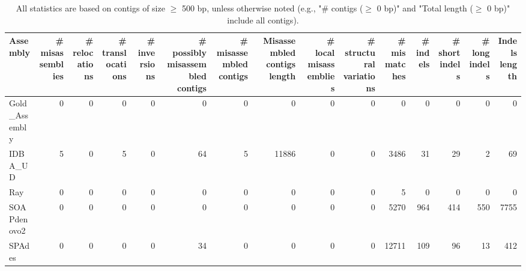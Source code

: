 \documentclass[12pt,a4paper]{article}
\begin{document}
\begin{table}[ht]
\begin{center}
\caption{All statistics are based on contigs of size $\geq$ 500 bp, unless otherwise noted (e.g., "\# contigs ($\geq$ 0 bp)" and "Total length ($\geq$ 0 bp)" include all contigs).}
\begin{tabular}{|l*{14}{|r}|}
\hline
Assembly & \# misassemblies &     \# relocations &     \# translocations &     \# inversions & \# possibly misassembled contigs & \# misassembled contigs & Misassembled contigs length & \# local misassemblies & \# structural variations & \# mismatches & \# indels &     \# short indels &     \# long indels & Indels length \\ \hline
Gold\_Assembly & 0 & 0 & 0 & 0 & 0 & 0 & 0 & 0 & 0 & 0 & 0 & 0 & 0 & 0 \\ \hline
IDBA\_UD & 5 & 0 & 5 & 0 & 64 & 5 & 11886 & 0 & 0 & 3486 & 31 & 29 & 2 & 69 \\ \hline
Ray & 0 & 0 & 0 & 0 & 0 & 0 & 0 & 0 & 0 & 5 & 0 & 0 & 0 & 0 \\ \hline
SOAPdenovo2 & 0 & 0 & 0 & 0 & 0 & 0 & 0 & 0 & 0 & 5270 & 964 & 414 & 550 & 7755 \\ \hline
SPAdes & 0 & 0 & 0 & 0 & 34 & 0 & 0 & 0 & 0 & 12711 & 109 & 96 & 13 & 412 \\ \hline
\end{tabular}
\end{center}
\end{table}
\end{document}
